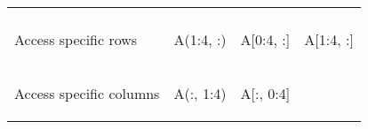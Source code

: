 \documentclass[10pt, landscape]{article}
\newenvironment{Shaded}{}{}
\newcommand{\DecValTok}[1]{\textcolor[rgb]{0.25,0.63,0.44}{{#1}}}
\newcommand{\FloatTok}[1]{\textcolor[rgb]{0.25,0.63,0.44}{{#1}}}
\newcommand{\NormalTok}[1]{{#1}}
\begin{document}
\begin{multicols*}{2}
\begin{table}[ht]
\begin{tabular}[ ]{@{}llll@{}}
\begin{minipage}[t]{0.20\columnwidth}
\end{minipage}\tabularnewline
\begin{minipage}[t]{0.23\columnwidth}\raggedright\strut
Access specific rows\strut
\end{minipage} & \begin{minipage}[t]{0.23\columnwidth}\raggedright\strut
\begin{Shaded}
\begin{Highlighting}[]
\NormalTok{A(}\FloatTok{1}\NormalTok{:}\FloatTok{4}\NormalTok{, :)}
\end{Highlighting}
\end{Shaded}
\strut
\end{minipage} & \begin{minipage}[t]{0.23\columnwidth}\raggedright\strut
\begin{Shaded}
\begin{Highlighting}[]
\NormalTok{A[}\DecValTok{0}\NormalTok{:}\DecValTok{4}\NormalTok{, :]}
\end{Highlighting}
\end{Shaded}
\strut
\end{minipage} & \begin{minipage}[t]{0.20\columnwidth}\raggedright\strut
\begin{Shaded}
\begin{Highlighting}[]
\NormalTok{A[}\FloatTok{1}\NormalTok{:}\FloatTok{4}\NormalTok{, :]}
\end{Highlighting}
\end{Shaded}
\strut
\end{minipage}\tabularnewline
\begin{minipage}[t]{0.23\columnwidth}\raggedright\strut
Access specific columns\strut
\end{minipage} & \begin{minipage}[t]{0.23\columnwidth}\raggedright\strut
\begin{Shaded}
\begin{Highlighting}[]
\NormalTok{A(:, }\FloatTok{1}\NormalTok{:}\FloatTok{4}\NormalTok{)}
\end{Highlighting}
\end{Shaded}
\strut
\end{minipage} & \begin{minipage}[t]{0.23\columnwidth}\raggedright\strut
\begin{Shaded}
\begin{Highlighting}[]
\NormalTok{A[:, }\DecValTok{0}\NormalTok{:}\DecValTok{4}\NormalTok{]}
\end{Highlighting}

\end{Shaded}
\end{minipage}
\end{tabular}
\end{table}
\end{multicols*}
\end{document}

